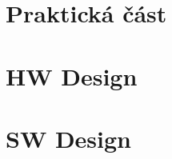 \documentclass[twoside]{template/ctuthesis}
\theoremstyle{plain}
\theoremstyle{definition}
\theoremstyle{note}
\begin{document}
\maketitle



\part{Praktická část}



\part{HW Design}


\part{SW Design}









\appendix

\printindex

\appendix




\end{document}
